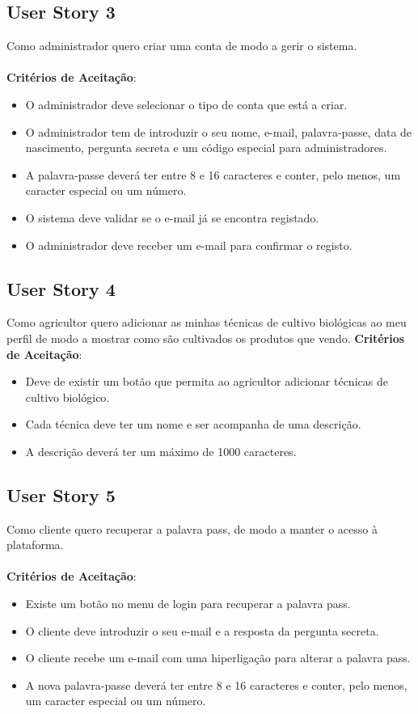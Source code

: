 \documentclass[a4paper,11pt]{article}
\begin{document}
\subsection{User Story 3}
Como administrador quero criar uma conta de modo a gerir o sistema.\\\\
\textbf{Critérios de Aceitação}:
\begin{itemize}
  \item O administrador deve selecionar o tipo de conta que está a criar.
  \item O administrador tem de introduzir o seu nome, e-mail, palavra-passe, data de nascimento, pergunta secreta e um código especial para administradores.
  \item A palavra-passe deverá ter entre 8 e 16 caracteres e conter, pelo menos, um caracter especial ou um número.
  \item O sistema deve validar se o e-mail já se encontra registado.
  \item O administrador deve receber um e-mail para confirmar o registo.
\end{itemize}
\subsection{User Story 4}
Como agricultor quero adicionar as minhas técnicas de cultivo biológicas ao meu perfil de modo a mostrar como são cultivados os produtos que vendo.
\textbf{Critérios de Aceitação}:
\begin{itemize}
  \item Deve de existir um botão que permita ao agricultor adicionar técnicas de cultivo biológico.
  \item Cada técnica deve ter um nome e ser acompanha de uma descrição.
  \item A descrição deverá ter um máximo de 1000 caracteres.
\end{itemize}
\subsection{User Story 5}
Como cliente quero recuperar a palavra pass, de modo a manter o acesso à plataforma.\\\\
\textbf{Critérios de Aceitação}:
\begin{itemize}
  \item Existe um botão no menu de login para recuperar a palavra pass.
  \item O cliente deve introduzir o seu e-mail e a resposta da pergunta secreta.
  \item O cliente recebe um e-mail com uma hiperligação para alterar a palavra pass.
  \item A nova palavra-passe deverá ter entre 8 e 16 caracteres e conter, pelo menos, um caracter especial ou um número.
\end{itemize}
\end{document}
